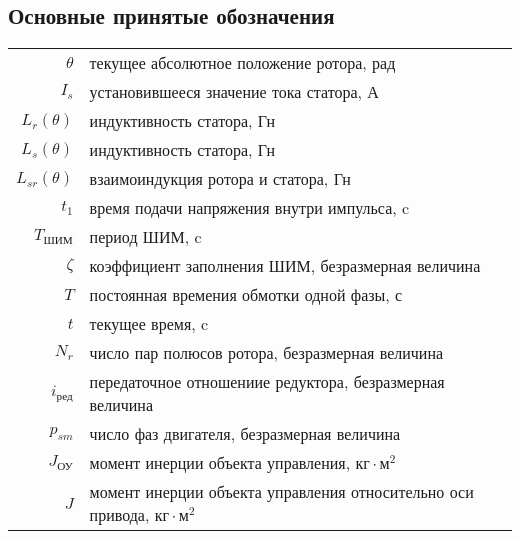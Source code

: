 \subsection{ Основные принятые обозначения }

\begin{table}[ht!]
\begin{tabular}{rl}
    $\theta$            & текущее абсолютное положение ротора, рад \\

    $I_{s}$             & установившееся значение тока статора, А \\

    $L_{r}(\theta)$     & индуктивность статора, Гн \\
    
    $L_{s}(\theta)$     & индуктивность статора, Гн \\
    
    $L_{sr}(\theta)$    & взаимоиндукция ротора и статора, Гн \\
    
    $t_{1}$             & время подачи напряжения внутри импульса, c \\
    
    $T_\text{ШИМ}$      & период ШИМ, c \\
    
    $\zeta$             & коэффициент заполнения ШИМ, безразмерная величина \\
    
    $T$                 & постоянная времения обмотки одной фазы, с \\
    
    $t$                 & текущее время, c \\
    
    $N_{r}$             & число пар полюсов ротора, безразмерная величина \\
    
    $i_\text{ред}$      & передаточное отношениие редуктора, безразмерная величина \\
    
    $p_{sm}$            & число фаз двигателя, безразмерная величина \\
    
    $J_{\text{ОУ}}$     & момент инерции объекта управления, $ \text{кг} \cdot \text{м}^{2} $ \\
    
    $J$                 & момент инерции объекта управления относительно оси привода,
                            $ \text{кг} \cdot \text{м}^{2} $ \\
    

\end{tabular}
\end{table}
